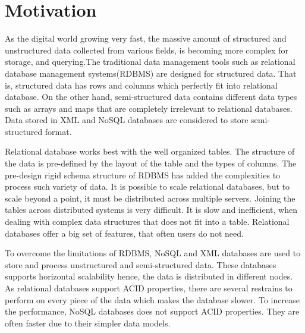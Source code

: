 
\section{Motivation}
		\label{motivation}
		    As the digital world growing very fast, the massive amount of structured and unstructured data collected from various fields, is becoming more complex for storage, and querying.The traditional data management tools such as relational database management systems(RDBMS) are designed for structured data. That is, structured data has rows and columns which perfectly fit into relational database. On the other hand, semi-structured data contains different data types such as arrays and maps that are completely irrelevant to relational databases. Data stored in XML and NoSQL databases are considered to store semi-structured format.
		\par
		 Relational database works best with the well organized tables. The structure of the data is pre-defined by the layout of the table and the types of columns. The pre-design rigid schema structure of RDBMS has added the complexities to process such variety of data. It is possible to scale relational databases, but to scale beyond a point, it must be distributed across multiple servers. Joining the tables across distributed systems is very difficult. It is slow and inefficient, when dealing with complex data structures that does not fit into a table. Relational databases offer a big set of features, that often users do not need.
	\par
	To overcome the limitations of RDBMS, NoSQL and XML databases are used to store and process unstructured and semi-structured data. These databases supports horizontal scalability hence, the data is distributed in different nodes. As relational databases support ACID properties, there are several restrains to perform on every piece of the data which makes the database slower. To increase the performance, NoSQL databases does not support ACID properties. They are often faster due to their simpler data models.  
	
